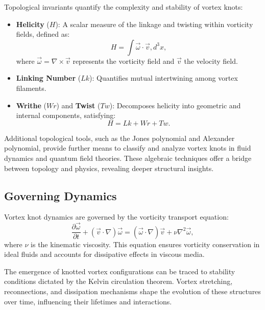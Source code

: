 Topological invariants quantify the complexity and stability of vortex knots:


\begin{itemize}

\item 
\textbf{Helicity} ($H$): A scalar measure of the linkage and twisting within vorticity fields, defined as:
\begin{equation}
H = \int \vec{\omega} \cdot \vec{v} , d^3x,
\end{equation}
where $\vec{\omega} = \nabla \times \vec{v}$ represents the vorticity field and $\vec{v}$ the velocity field.




\item 
\textbf{Linking Number} ($Lk$): Quantifies mutual intertwining among vortex filaments.




\item 
\textbf{Writhe} ($Wr$) and \textbf{Twist} ($Tw$): Decomposes helicity into geometric and internal components, satisfying:
\begin{equation}
H = Lk + Wr + Tw.
\end{equation}




\end{itemize}

Additional topological tools, such as the Jones polynomial and Alexander polynomial, provide further means to classify and analyze vortex knots in fluid dynamics and quantum field theories. These algebraic techniques offer a bridge between topology and physics, revealing deeper structural insights.


\subsection*{Governing Dynamics}


Vortex knot dynamics are governed by the vorticity transport equation:
\begin{equation}
\frac{\partial \vec{\omega}}{\partial t} + (\vec{v} \cdot \nabla) \vec{\omega} = (\vec{\omega} \cdot \nabla) \vec{v} + \nu \nabla^2 \vec{\omega},
\end{equation}
where $\nu$ is the kinematic viscosity. This equation ensures vorticity conservation in ideal fluids and accounts for dissipative effects in viscous media.


The emergence of knotted vortex configurations can be traced to stability conditions dictated by the Kelvin circulation theorem. Vortex stretching, reconnections, and dissipation mechanisms shape the evolution of these structures over time, influencing their lifetimes and interactions.


